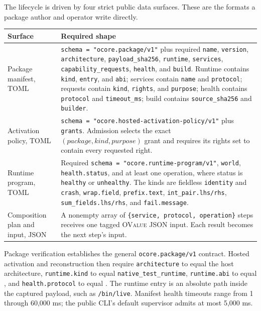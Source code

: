 \documentclass[11pt,oneside]{article}
\newcommand{\ovalue}{\textsc{OValue}}
\begin{document}
The lifecycle is driven by four strict public data surfaces. These are the
formats a package author and operator write directly.

\begin{longtable}{P{0.20\textwidth} P{0.72\textwidth}}
\toprule
\textbf{Surface} & \textbf{Required shape} \\
\midrule
\endhead
Package manifest, TOML &
\texttt{schema = "ocore.package/v1"} plus required \texttt{name},
\texttt{version}, \texttt{architecture}, \texttt{payload\_sha256},
\texttt{runtime}, \texttt{services}, \texttt{capability\_requests},
\texttt{health}, and \texttt{build}. Runtime contains \texttt{kind},
\texttt{entry}, and \texttt{abi}; services contain \texttt{name} and
\texttt{protocol}; requests contain \texttt{kind}, \texttt{rights}, and
\texttt{purpose}; health contains \texttt{protocol} and \texttt{timeout\_ms};
build contains \texttt{source\_sha256} and \texttt{builder}. \\
Activation policy, TOML &
\texttt{schema = "ocore.hosted-activation-policy/v1"} plus
\texttt{grants}. Admission selects the exact $(package, kind, purpose)$ grant
and requires its rights set to contain every requested right. \\
Runtime program, TOML &
Required \texttt{schema = "ocore.runtime-program/v1"}, \texttt{world},
\texttt{health.status}, and at least one operation, where status is
\texttt{healthy} or \texttt{unhealthy}. The kinds are fieldless
\texttt{identity} and \texttt{crash}, \texttt{wrap.field},
\texttt{prefix.text}, \texttt{int\_pair.lhs/rhs},
\texttt{sum\_fields.lhs/rhs}, and \texttt{fail.message}. \\
Composition plan and input, JSON &
A nonempty array of \texttt{\{service, protocol, operation\}} steps receives
one tagged \ovalue{} JSON input. Each result becomes the next step's input. \\
\bottomrule
\end{longtable}

Package verification establishes the general \texttt{ocore.package/v1}
contract. Hosted activation and reconstruction then require
\texttt{architecture} to equal the host architecture,
\texttt{runtime.kind} to equal
\texttt{native\_\allowbreak test\_\allowbreak runtime},
\texttt{runtime.abi} to equal , and
\texttt{health.protocol} to equal . The runtime entry is an absolute
path inside the captured payload, such as \texttt{/bin/live}. Manifest health
timeouts range from 1 through 60,000 ms; the public CLI's default supervisor
admits at most 5,000 ms.
\end{document}
